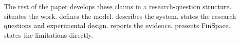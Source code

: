 The rest of the paper develops these claims in a research-question structure.  situates the work.  defines the model.  describes the system.  states the research questions and experimental design.  reports the evidence.  presents FinSpace.  states the limitations directly.
